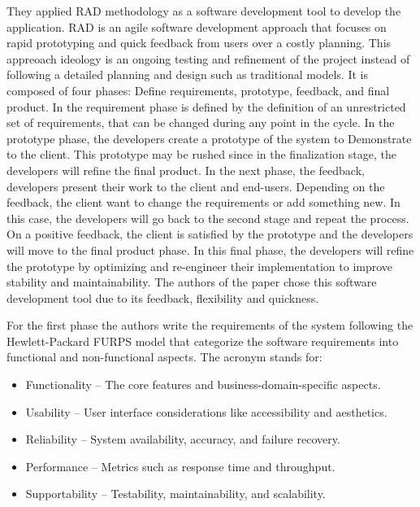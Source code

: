 They applied \ac{RAD} methodology as a software development tool to develop the application.
\ac{RAD} is an agile software development approach that focuses on rapid prototyping and quick feedback from users over a costly planning. \cite{rapid_app_development}
This appreoach ideology is an ongoing testing and refinement of the project instead of following a detailed planning and design such as traditional models.
It is composed of four phases: Define requirements, prototype, feedback, and final product. \cite{rapid_app_development}
In the requirement phase is defined by the definition of an unrestricted set of requirements, that can be changed during any point in the cycle. 
In the prototype phase, the developers create a prototype of the system to Demonstrate to the client. 
This prototype may be rushed since in the finalization stage, the developers will refine the final product. \cite{rapid_app_development}
In the next phase, the feedback, developers present their work to the client and end-users.
Depending on the feedback, the client want to change the requirements or add something new. In this case, the developers will go back to the second stage and repeat the process. \cite{rapid_app_development}
On a positive feedback, the client is satisfied by the prototype and the developers will move to the final product phase.
In this final phase, the developers will refine the prototype by optimizing and re-engineer their implementation to improve stability and maintainability. \cite{rapid_app_development}
The authors of the paper chose this software development tool due to its feedback, flexibility and quickness.

For the first phase the authors write the requirements of the system following the Hewlett-Packard \ac{FURPS} model that categorize the software requirements into functional and non-functional aspects.
The acronym stands for:

\begin{itemize}
  \item Functionality – The core features and business-domain-specific aspects.
  \item Usability – User interface considerations like accessibility and aesthetics.
  \item Reliability – System availability, accuracy, and failure recovery.
  \item Performance – Metrics such as response time and throughput.
  \item Supportability – Testability, maintainability, and scalability.
\end{itemize}


